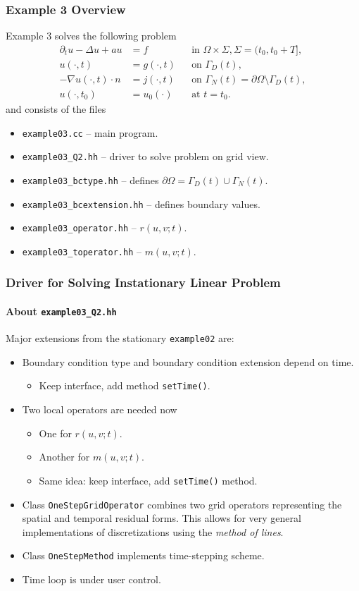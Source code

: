 \begin{frame}
\frametitle{Example 3 Overview}
Example 3 solves the following problem
\begin{subequations}
\begin{align*}
\partial_t u -\Delta u + a u &= f &&\text{in $\Omega\times\Sigma$}, \Sigma=(t_0,t_0+T],\\
u(\cdot,t) &= g(\cdot,t) && \text{on $\Gamma_D(t)$},\\
-\nabla u(\cdot,t) \cdot n &= j(\cdot,t) &&\text{on $\Gamma_N(t)=\partial\Omega\setminus\Gamma_D(t)$},\\
u(\cdot,t_0) &= u_0(\cdot) && \text{at $t=t_0$}.
\end{align*}
\end{subequations}
and consists of the files
\begin{itemize}
\item \lstinline{example03.cc} -- main program.
\item \lstinline{example03_Q2.hh} -- driver to solve problem on grid view.
\item \lstinline{example03_bctype.hh} -- defines $\partial\Omega = \Gamma_D(t) \cup \Gamma_N(t)$.
\item \lstinline{example03_bcextension.hh} -- defines boundary values.
\item \lstinline{example03_operator.hh} -- $r(u,v;t)$.
\item \lstinline{example03_toperator.hh} -- $m(u,v;t)$.
\end{itemize}
\end{frame}

\begin{frame}
\frametitle{Driver for Solving Instationary Linear Problem}
\framesubtitle{About \lstinline{example03_Q2.hh}}
Major extensions from the stationary \lstinline{example02} are:
\begin{itemize}
\item Boundary condition type and boundary condition extension depend on time.
\begin{itemize}
\item Keep interface, add method \lstinline{setTime()}.
\end{itemize}
\item Two local operators are needed now
\begin{itemize}
\item One for $r(u,v;t)$.
\item Another for $m(u,v;t)$.
\item Same idea: keep interface, add \lstinline{setTime()} method.
\end{itemize}
\item Class \lstinline{OneStepGridOperator} combines two grid
  operators representing the spatial and temporal residual forms. This allows for very general
  implementations of discretizations using the \textit{method of
    lines}.
\item Class \lstinline{OneStepMethod} implements time-stepping scheme.
\item Time loop is under user control.
\end{itemize}
\end{frame}

